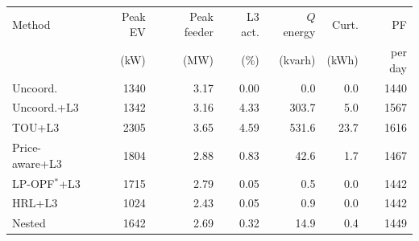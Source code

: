 \begin{tabular}{@{}lrrrrrr@{}}
\toprule
Method & Peak EV & Peak feeder & L3 act. & $Q$ energy & Curt. & PF \\
 & (kW) & (MW) & (\%) & (kvarh) & (kWh) & per day \\
\midrule
Uncoord. & 1340 & 3.17 & 0.00 & 0.0 & 0.0 & 1440 \\
Uncoord.+L3 & 1342 & 3.16 & 4.33 & 303.7 & 5.0 & 1567 \\
TOU+L3 & 2305 & 3.65 & 4.59 & 531.6 & 23.7 & 1616 \\
Price-aware+L3 & 1804 & 2.88 & 0.83 & 42.6 & 1.7 & 1467 \\
LP-OPF$^\ast$+L3 & 1715 & 2.79 & 0.05 & 0.5 & 0.0 & 1442 \\
HRL+L3 & 1024 & 2.43 & 0.05 & 0.9 & 0.0 & 1442 \\
Nested & 1642 & 2.69 & 0.32 & 14.9 & 0.4 & 1449 \\
\bottomrule
\end{tabular}
